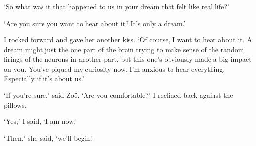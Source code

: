 `So what was it that happened to us in your dream that felt like
real life?'

`Are you sure you want to hear about it? It's only a dream.'

I rocked forward and gave her another kiss. `Of course, I want to
hear about it. A dream might just the one part of the brain trying
to make sense of the random firings of the neurons in another part,
but this one's obviously made a big impact on you. You've piqued my
curiosity now. I'm anxious to hear everything. Especially if it's
about us.'

`If you're sure,' said Zoë. `Are you comfortable?' I reclined back against the pillows.

`Yes,' I said, `I am now.'

`Then,' she said, `we'll begin.'
\vfill\eject 
